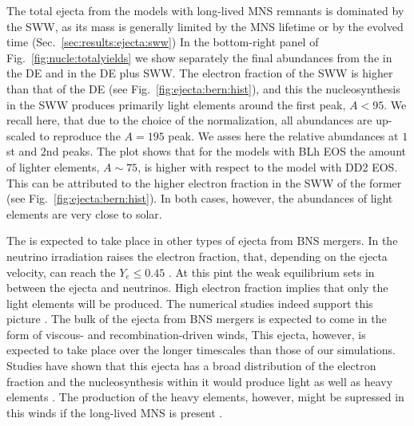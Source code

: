 The total ejecta from the models with long-lived \ac{MNS} remnants is dominated by
the \ac{SWW}, as its mass is generally limited by the \ac{MNS} lifetime 
or by the evolved time (Sec.~\ref{sec:results:ejecta:sww})
In the bottom-right panel of Fig.~\ref{fig:nucle:totalyields} we show separately the 
final abundances from the \rproc{} in the \ac{DE} and in the \ac{DE} plus \ac{SWW}. 
The electron fraction of the \ac{SWW} is higher than that of the \ac{DE} 
(see Fig.~\ref{fig:ejecta:bern:hist}), and this the \rproc{} nucleosynthesis in the 
\ac{SWW} produces primarily light elements around the first \rproc{} peak, $A<95$.
We recall here, that due to the choice of the normalization, all abundances are up-scaled 
to reproduce the $A=195$ peak. We asses here the relative abundances at $1$st and $2$nd
\rproc{} peaks.
%
The plot shows that for the models with BLh \ac{EOS} the amount of lighter elements, 
$A\sim75$, is higher with respect to the model with DD2 \ac{EOS}. This can be attributed 
to the higher electron fraction in the \ac{SWW} of the former (see Fig.~\ref{fig:ejecta:bern:hist}).
In both cases, however, the abundances of light elements are very close to solar. 


The \rproc{} is expected to take place in other types of ejecta from \ac{BNS} mergers.
In \nwind{} the neutrino irradiation raises the electron fraction, that, depending 
on the ejecta velocity, can reach the $Y_e\leq 0.45$ \citep{Qian:1996xt}. 
At this pint the weak equilibrium sets in between the ejecta and neutrinos.
High electron fraction implies that only the light elements will be produced.
The numerical studies indeed support this picture 
\citep{Dessart:2008zd,Perego:2014fma,Just:2014fka,Martin:2015hxa,Foucart:2016rxm}. 
The bulk of the ejecta from \ac{BNS} mergers is expected to come in the form of 
viscous- and recombination-driven winds, This ejecta, however, is expected to take 
place over the longer timescales than those of our simulations.
Studies have shown that this ejecta has a broad distribution of the electron fraction 
and the \rproc{} nucleosynthesis within it would produce light as well as heavy elements
\citep{Fernandez:2013tya,Just:2014fka,Wu:2016pnw,Siegel:2017nub,Fujibayashi:2017puw,Fernandez:2018kax}.
The production of the heavy \rproc{} elements, however, might be supressed in this winds
if the long-lived \ac{MNS} is present \citep{Metzger:2014ila,Lippuner:2017bfm}.